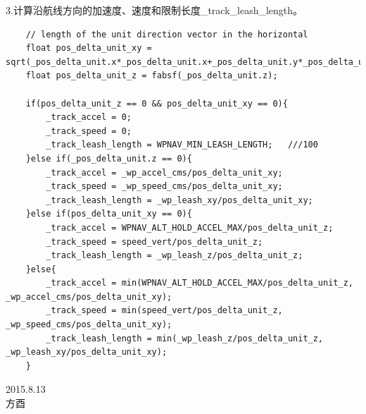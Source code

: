 \documentclass[a4paper,10pt]{ctexart} %
\begin{document}
3.计算沿航线方向的加速度、速度和限制长度\_track\_leash\_length。
\begin{lstlisting}
    // length of the unit direction vector in the horizontal
    float pos_delta_unit_xy = sqrt(_pos_delta_unit.x*_pos_delta_unit.x+_pos_delta_unit.y*_pos_delta_unit.y);
    float pos_delta_unit_z = fabsf(_pos_delta_unit.z);

    if(pos_delta_unit_z == 0 && pos_delta_unit_xy == 0){
        _track_accel = 0;
        _track_speed = 0;
        _track_leash_length = WPNAV_MIN_LEASH_LENGTH;	///100
    }else if(_pos_delta_unit.z == 0){
        _track_accel = _wp_accel_cms/pos_delta_unit_xy;
        _track_speed = _wp_speed_cms/pos_delta_unit_xy;
        _track_leash_length = _wp_leash_xy/pos_delta_unit_xy;
    }else if(pos_delta_unit_xy == 0){
        _track_accel = WPNAV_ALT_HOLD_ACCEL_MAX/pos_delta_unit_z;
        _track_speed = speed_vert/pos_delta_unit_z;
        _track_leash_length = _wp_leash_z/pos_delta_unit_z;
    }else{
        _track_accel = min(WPNAV_ALT_HOLD_ACCEL_MAX/pos_delta_unit_z, _wp_accel_cms/pos_delta_unit_xy);
        _track_speed = min(speed_vert/pos_delta_unit_z, _wp_speed_cms/pos_delta_unit_xy);
        _track_leash_length = min(_wp_leash_z/pos_delta_unit_z, _wp_leash_xy/pos_delta_unit_xy);
    }
\end{lstlisting}


\begin{flushright}
\vspace{10pt}
2015.8.13\\
方酉
\end{flushright}
\end{document}
